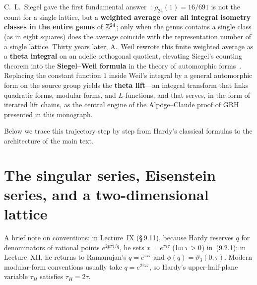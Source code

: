 C.~L.~Siegel gave the first fundamental answer~\cite{Siegel1935}: $\rho_{24}(1)=16/691$ is not the count for a single lattice, but a \textbf{weighted average over all integral isometry classes in the entire genus} of $\mathbb{Z}^{24}$; only when the genus contains a single class (as in eight squares) does the average coincide with the representation number of a single lattice. Thirty years later, A.~Weil rewrote this finite weighted average as a \textbf{theta integral} on an adelic orthogonal quotient, elevating Siegel's counting theorem into the \textbf{Siegel--Weil formula} in the theory of automorphic forms~\cite{Weil1964,Weil1965}. Replacing the constant function $1$ inside Weil's integral by a general automorphic form on the source group yields the \textbf{theta lift}---an integral transform that links quadratic forms, modular forms, and $L$-functions, and that serves, in the form of iterated lift chains, as the central engine of the Alpöge--Claude proof of GRH presented in this monograph.

Below we trace this trajectory step by step from Hardy's classical formulas to the architecture of the main text.

\section{The singular series, Eisenstein series, and a two-dimensional lattice}

A brief note on conventions: in Lecture~IX (\S\,9.11), because Hardy reserves $q$ for denominators of rational points $e^{2p\pi i/q}$, he sets $x=e^{\pi i\tau}$ ($\operatorname{Im}\tau>0$) in~(9.2.1); in Lecture~XII, he returns to Ramanujan's $q=e^{\pi i\tau}$ and $\phi(q)=\vartheta_3(0,\tau)$. Modern modular-form conventions usually take $q=e^{2\pi i\tau}$, so Hardy's upper-half-plane variable $\tau_H$ satisfies $\tau_H=2\tau$.

